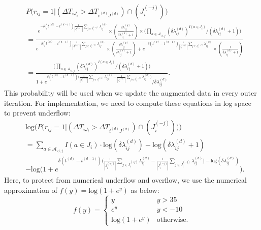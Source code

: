 \documentclass[a4paper]{article}
\begin{document}
   \begin{equation}
   	\begin{split}
   		&P\Big(r_{ij}=1|(\Delta T_{i{J_i}} > \Delta T_{i^{(d)}{J^{(d)}}})\cap( J_i^{(-j)})\Big)
   		\\&=\frac{e^{-\delta(t^{(d)}-t^{(d-1)})\frac{1}{|J_i^{(+j)}|}\sum\limits_{j \in J_i^{(+j)}}\lambda^{(d)}_{ij}}\times(\frac{\delta\lambda^{(d)}_{ij}}{\delta\lambda^{(d)}_{ij}+1})\times\Big(\prod_{a \in \mathcal{A}_{\backslash i, j}} {(\delta\lambda^{(d)}_{ij})}^{I(a \in J_i)} / (\delta\lambda^{(d)}_{ij}+1)\Big)}{e^{-\delta(t^{(d)}-t^{(d-1)})\frac{1}{|J_i^{(+j)}|}\sum\limits_{j \in J_i^{(+j)}}\lambda^{(d)}_{ij}}\times(\frac{\delta\lambda^{(d)}_{ij}}{\delta\lambda^{(d)}_{ij}+1})+e^{-\delta(t^{(d)}-t^{(d-1)})\frac{1}{|J_i^{(-j)}|}\sum\limits_{j \in J_i^{(-j)}}\lambda^{(d)}_{ij}}\times(\frac{1}{\delta\lambda^{(d)}_{ij}+1})}
\\&=\frac{\Big(\prod_{a \in \mathcal{A}_{\backslash i, j}} {(\delta\lambda^{(d)}_{ij})}^{I(a \in J_i)} / (\delta\lambda^{(d)}_{ij}+1)\Big)}{1 + e^{\delta(t^{(d)}-t^{(d-1)})\big(\frac{1}{|J_i^{(+j)}|}\sum\limits_{j \in J_i^{(+j)}}\lambda^{(d)}_{ij} -\frac{1}{|J_i^{(-j)}|}\sum\limits_{j \in J_i^{(-j)}}\lambda^{(d)}_{ij} \big)} / \delta\lambda^{(d)}_{ij}}.   	\end{split}
   \end{equation}
  This probability will be used when we update the augmented data in every outer iteration. For implementation, we need to compute these equations in log space to prevent underflow:
  \begin{equation}
  \begin{aligned}
  &\mbox{log}\Big(P\Big(r_{ij}=1|(\Delta T_{i{J_i}} > \Delta T_{i^{(d)}{J^{(d)}}})\cap( J_i^{(-j)})\Big)\Big)\\&=\sum_{a \in \mathcal{A}_{\backslash i, j}} {{I(a \in J_i)}\cdot \mbox{log}(\delta\lambda^{(d)}_{ij})}- \mbox{log}(\delta\lambda^{(d)}_{ij}+1)\\&-\mbox{log}\Big(1 + e^{\delta(t^{(d)}-t^{(d-1)})\big(\frac{1}{|J_i^{(+j)}|}\sum\limits_{j \in J_i^{(+j)}}\lambda^{(d)}_{ij} -\frac{1}{|J_i^{(-j)}|}\sum\limits_{j \in J_i^{(-j)}}\lambda^{(d)}_{ij} \big) - \mbox{log}(\delta\lambda^{(d)}_{ij})} \Big).   
  \end{aligned}
  \end{equation}
  Here, to protect from numerical underflow and overflow, we use the numerical approximation of $f(y) = \mbox{log}(1+ e^y)$ as below:
  \begin{equation*}
  f(y) = \begin{cases}
  y &y >35\\
  e^y & y<-10\\
  \mbox{log}(1+e^y) & \mbox{otherwise}.
  \end{cases}
  \end{equation*}
\end{document}
